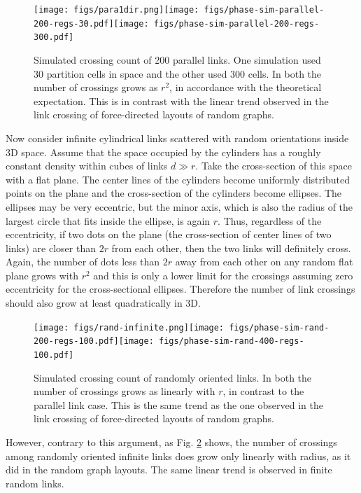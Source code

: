 \documentclass[nofootinbib,preprint,floatfix,titlepage,endfloats,superscriptaddress]{revtex4} %
\begin{document}
\begin{figure}
    \centering
    \texttt{[image: figs/para1dir.png]}\texttt{[image: figs/phase-sim-parallel-200-regs-30.pdf]}\texttt{[image: figs/phase-sim-parallel-200-regs-300.pdf]}
    \caption{Simulated crossing count of 200 parallel links. One simulation used 30 partition cells in space and the other used 300 cells. In both the number of crossings grows as $r^2$, in accordance with the theoretical expectation. This is in contrast with the linear trend observed in the link crossing of force-directed layouts of random graphs.}
    \label{fig:simpara}
\end{figure}


Now consider infinite cylindrical links scattered with random orientations inside 3D space. Assume that the space occupied by the cylinders has a roughly constant density within cubes of links $d \gg r$. Take the cross-section of this space with a flat plane. The center lines of the cylinders become uniformly distributed points on the plane and the cross-section of the cylinders become ellipses. The ellipses may be very eccentric, but the minor axis, which is also the radius of the largest circle that fits inside the ellipse, is again $r$. Thus, regardless of the eccentricity, if two dots on the plane (the cross-section of center lines of two links) are closer than $2r$ from each other, then the two links will definitely cross. Again, the number of dots less than $2r$ away from each other on any random flat plane grows with $r^2$ and this is only a lower limit for the crossings assuming zero eccentricity for the cross-sectional ellipses.  Therefore the number of link crossings should also grow at least quadratically in 3D.

\begin{figure}
    \centering
    \texttt{[image: figs/rand-infinite.png]}\texttt{[image: figs/phase-sim-rand-200-regs-100.pdf]}\texttt{[image: figs/phase-sim-rand-400-regs-100.pdf]}
    \caption{Simulated crossing count of  randomly oriented links. In both the number of crossings grows as linearly with $r$, in contrast to the parallel link case. This is the same trend as the one observed in the link crossing of force-directed layouts of random graphs.}
    \label{fig:simrand}
\end{figure}

However, contrary to this argument, as Fig. \ref{fig:simrand} shows, the number of crossings among randomly oriented infinite links does grow only linearly with radius, as it did in the random graph layouts. The same linear trend is observed in finite random links.  
\end{document}
